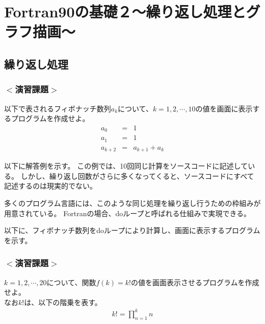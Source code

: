 \documentclass[a4j]{jsbook}
\begin{document}

\chapter{Fortran90の基礎２〜繰り返し処理とグラフ描画〜}
\section{繰り返し処理}
\subsection*{$<$演習課題$>$}
以下で表されるフィボナッチ数列$a_k$について、$k=1,2, \cdots, 10$の値を画面に表示するプログラムを作成せよ。 \\
\begin{eqnarray}
a_0 &=& 1 \\
a_1 &=& 1 \\
a_{k+2} &=& a_{k+1} + a_k
\end{eqnarray}

以下に解答例を示す。
この例では、10回同じ計算をソースコードに記述している。
しかし、繰り返し回数がさらに多くなってくると、ソースコードにすべて記述するのは現実的でない。

多くのプログラム言語には、このような同じ処理を繰り返し行うための枠組みが用意されている。
Fortranの場合、{\ttfamily do}ループと呼ばれる仕組みで実現できる。

以下に、フィボナッチ数列を{\ttfamily do}ループにより計算し、画面に表示するプログラムを示す。



\subsection*{$<$演習課題$>$}
$k=1,2, \cdots, 20$について、関数$f(k) = k!$の値を画面表示させるプログラムを作成せよ。\\
なお$k!$は、以下の階乗を表す。
\begin{eqnarray}
k! = \prod_{n=1}^{k} n
\end{eqnarray}
\end{document}
